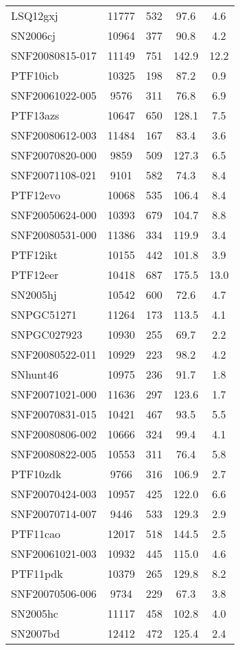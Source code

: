\begin{longtable}{lcccc}
LSQ12gxj & 11777 & 532 & 97.6 & 4.6 \\
SN2006cj & 10964 & 377 & 90.8 & 4.2 \\
SNF20080815-017 & 11149 & 751 & 142.9 & 12.2 \\
PTF10icb & 10325 & 198 & 87.2 & 0.9 \\
SNF20061022-005 & 9576 & 311 & 76.8 & 6.9 \\
PTF13azs & 10647 & 650 & 128.1 & 7.5 \\
SNF20080612-003 & 11484 & 167 & 83.4 & 3.6 \\
SNF20070820-000 & 9859 & 509 & 127.3 & 6.5 \\
SNF20071108-021 & 9101 & 582 & 74.3 & 8.4 \\
PTF12evo & 10068 & 535 & 106.4 & 8.4 \\
SNF20050624-000 & 10393 & 679 & 104.7 & 8.8 \\
SNF20080531-000 & 11386 & 334 & 119.9 & 3.4 \\
PTF12ikt & 10155 & 442 & 101.8 & 3.9 \\
PTF12eer & 10418 & 687 & 175.5 & 13.0 \\
SN2005hj & 10542 & 600 & 72.6 & 4.7 \\
SNPGC51271 & 11264 & 173 & 113.5 & 4.1 \\
SNPGC027923 & 10930 & 255 & 69.7 & 2.2 \\
SNF20080522-011 & 10929 & 223 & 98.2 & 4.2 \\
SNhunt46 & 10975 & 236 & 91.7 & 1.8 \\
SNF20071021-000 & 11636 & 297 & 123.6 & 1.7 \\
SNF20070831-015 & 10421 & 467 & 93.5 & 5.5 \\
SNF20080806-002 & 10666 & 324 & 99.4 & 4.1 \\
SNF20080822-005 & 10553 & 311 & 76.4 & 5.8 \\
PTF10zdk & 9766 & 316 & 106.9 & 2.7 \\
SNF20070424-003 & 10957 & 425 & 122.0 & 6.6 \\
SNF20070714-007 & 9446 & 533 & 129.3 & 2.9 \\
PTF11cao & 12017 & 518 & 144.5 & 2.5 \\
SNF20061021-003 & 10932 & 445 & 115.0 & 4.6 \\
PTF11pdk & 10379 & 265 & 129.8 & 8.2 \\
SNF20070506-006 & 9734 & 229 & 67.3 & 3.8 \\
SN2005hc & 11117 & 458 & 102.8 & 4.0 \\
SN2007bd & 12412 & 472 & 125.4 & 2.4 \\

\end{longtable}
